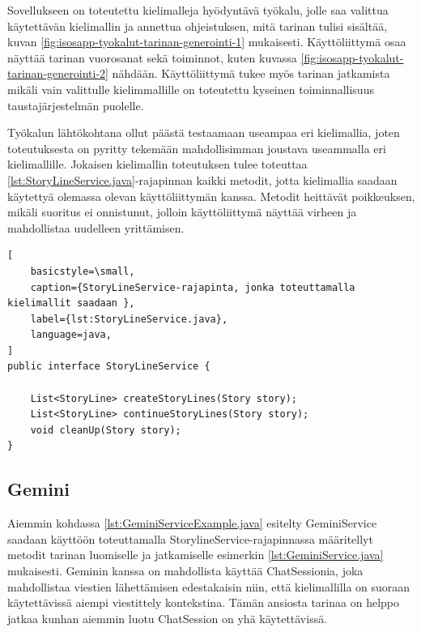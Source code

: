Sovellukseen on toteutettu kielimalleja hyödyntävä työkalu, jolle saa valittua
käytettävän kielimallin ja annettua ohjeistuksen, mitä tarinan tulisi sisältää,
kuvan \ref{fig:isosapp-tyokalut-tarinan-generointi-1} mukaisesti.
Käyttöliittymä osaa näyttää tarinan vuorosanat sekä toiminnot, kuten kuvassa
\ref{fig:isosapp-tyokalut-tarinan-generointi-2} nähdään. Käyttöliittymä tukee
myös tarinan jatkamista mikäli vain valittulle kielimmallille on toteutettu
kyseinen toiminnallisuus taustajärjestelmän puolelle.

Työkalun lähtökohtana ollut päästä testaamaan useampaa eri kielimallia, joten
toteutuksesta on pyritty tekemään mahdollisimman joustava useammalla eri
kielimallille. Jokaisen kielimallin toteutuksen tulee toteuttaa
\ref{lst:StoryLineService.java}-rajapinnan kaikki metodit, jotta kielimallia
saadaan käytettyä olemassa olevan käyttöliittymän kanssa. Metodit heittävät
poikkeuksen, mikäli suoritus ei onnistunut, jolloin käyttöliittymä näyttää
virheen ja mahdollistaa uudelleen yrittämisen.

\clearpage
\begin{lstlisting}[
    basicstyle=\small,
    caption={StoryLineService-rajapinta, jonka toteuttamalla kielimallit saadaan },
    label={lst:StoryLineService.java},
    language=java,
]
public interface StoryLineService {

    List<StoryLine> createStoryLines(Story story);
    List<StoryLine> continueStoryLines(Story story);
    void cleanUp(Story story);
}
\end{lstlisting}

\subsection{Gemini}

Aiemmin kohdassa \ref{lst:GeminiServiceExample.java} esitelty GeminiService
saadaan käyttöön toteuttamalla StorylineService-rajapinnassa määritellyt
metodit tarinan luomiselle ja jatkamiselle esimerkin
\ref{lst:GeminiService.java} mukaisesti. Geminin kanssa on mahdollista käyttää
ChatSessionia, joka mahdollistaa viestien lähettämisen edestakaisin niin, että
kielimallilla on suoraan käytettävissä aiempi viestittely kontekstina. Tämän
ansiosta tarinaa on helppo jatkaa kunhan aiemmin luotu ChatSession on yhä
käytettävissä.

